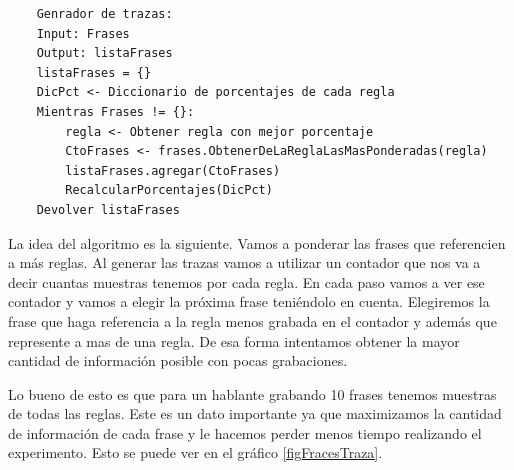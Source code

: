 \documentclass[11pt,a4paper,twoside]{tesis}
\begin{document}
\begin{lstlisting}
    Genrador de trazas:
    Input: Frases
    Output: listaFrases 
    listaFrases = {}
    DicPct <- Diccionario de porcentajes de cada regla
    Mientras Frases != {}:
    	regla <- Obtener regla con mejor porcentaje
    	CtoFrases <- frases.ObtenerDeLaReglaLasMasPonderadas(regla)
    	listaFrases.agregar(CtoFrases)
    	RecalcularPorcentajes(DicPct)
    Devolver listaFrases
\end{lstlisting}

La idea del algoritmo es la siguiente. Vamos a ponderar las frases que referencien a más reglas. Al generar las trazas vamos a utilizar un contador que nos va a decir cuantas muestras tenemos por cada regla. En cada paso vamos a ver ese contador y vamos a elegir la próxima frase teniéndolo en cuenta. Elegiremos la frase que haga referencia a la regla menos grabada en el contador y además que represente a mas de una regla. De esa forma intentamos obtener la mayor cantidad de información posible con pocas grabaciones.

Lo bueno de esto es que para un hablante grabando 10 frases tenemos muestras de todas las reglas. Este es un dato importante ya que maximizamos la cantidad de información de cada frase y le hacemos perder menos tiempo realizando el experimento. Esto se puede ver en el gráfico \ref{figFracesTraza}.
\end{document}
